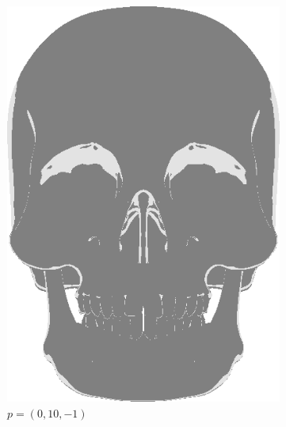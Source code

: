 \begin{figure}[h]
\begin{subfigure}[b]{0.22\textwidth}
        \includegraphics[width=\textwidth]{img/Lighting/Directional(10,-1).png}
        \caption{$p = (0,10,-1)$}
        \label{fig:LightingPosDir2}
    \end{subfigure}
~
\hspace{24pt}
~
    \begin{subfigure}[b]{0.22\textwidth}

\end{subfigure}
\end{figure}
